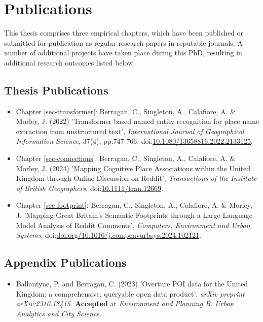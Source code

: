 \chapter{Publications}

This thesis comprises three empirical chapters, which have been published or submitted for publication as regular research papers in reputable journals. A number of additional projects have taken place during this PhD, resulting in additional research outcomes listed below.

\section*{Thesis Publications}

\begin{itemize}

  \item Chapter \ref{sec-transformer}: Berragan, C., Singleton, A., Calafiore, A. \& Morley, J. (2022) 'Transformer based named entity recognition for place name extraction from unstructured text', \textit{International Journal of Geographical Information Science}, 37(4), pp.747-766. doi:\href{https://doi.org/10.1080/13658816.2022.2133125}{10.1080/13658816.2022.2133125}.

  \item Chapter \ref{sec-connections}: Berragan, C., Singleton, A., Calafiore, A. \& Morley, J. (2024) 'Mapping Cognitive Place Associations within the United Kingdom through Online Discussion on Reddit', \textit{Transactions of the Institute of British Geographers}. doi:\href{https://doi.org/10.1111/tran.12669}{10.1111/tran.12669}.

  \item Chapter \ref{sec-footprint}: Berragan, C., Singleton, A., Calafiore, A. \& Morley, J. 'Mapping Great Britain's Semantic Footprints through a Large Language Model Analysis of Reddit Comments', \textit{Computers, Environment and Urban Systems}, doi:\href{https://doi.org/10.1016/j.compenvurbsys.2024.102121}{doi.org/10.1016/j.compenvurbsys.2024.102121}.

\end{itemize}

\section*{Appendix Publications}

\begin{itemize}
  \item Ballantyne, P. and Berragan, C. (2023) 'Overture POI data for the United Kingdom: a comprehensive, queryable open data product', \textit{arXiv preprint arXiv:2310.18415.} \textbf{Accepted} at \textit{Environment and Planning B: Urban Analytics and City Science}.
\end{itemize}

